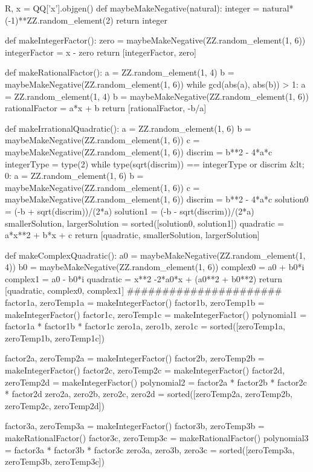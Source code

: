 \documentclass{ximera}
\begin{document}
\begin{sagesilent}
R, x = QQ['x'].objgen()
def maybeMakeNegative(natural):
    integer = natural*(-1)**ZZ.random_element(2)
    return integer
 
def makeIntegerFactor():
    zero = maybeMakeNegative(ZZ.random_element(1, 6))
    integerFactor = x - zero
    return [integerFactor, zero]
 
def makeRationalFactor():
    a = ZZ.random_element(1, 4)
    b = maybeMakeNegative(ZZ.random_element(1, 6))
    while gcd(abs(a), abs(b)) > 1:
        a = ZZ.random_element(1, 4)
        b = maybeMakeNegative(ZZ.random_element(1, 6))
    rationalFactor = a*x + b
    return [rationalFactor, -b/a]
 
def makeIrrationalQuadratic():
    a = ZZ.random_element(1, 6)
    b = maybeMakeNegative(ZZ.random_element(1, 6))
    c = maybeMakeNegative(ZZ.random_element(1, 6))
    discrim = b**2 - 4*a*c
    integerType = type(2)
    while type(sqrt(discrim)) == integerType or discrim &lt; 0:
        a = ZZ.random_element(1, 6)
        b = maybeMakeNegative(ZZ.random_element(1, 6))
        c = maybeMakeNegative(ZZ.random_element(1, 6))
        discrim = b**2 - 4*a*c
    solution0 = (-b + sqrt(discrim))/(2*a)
    solution1 = (-b - sqrt(discrim))/(2*a)
    smallerSolution, largerSolution = sorted([solution0, solution1])
    quadratic = a*x**2 + b*x + c
    return [quadratic, smallerSolution, largerSolution]
 
def makeComplexQuadratic():
    a0 = maybeMakeNegative(ZZ.random_element(1, 4))
    b0 = maybeMakeNegative(ZZ.random_element(1, 6))
    complex0 = a0 + b0*i
    complex1 = a0 - b0*i
    quadratic = x**2 -2*a0*x + (a0**2 + b0**2)
    return [quadratic, complex0, complex1]
######################
factor1a, zeroTemp1a = makeIntegerFactor()
factor1b, zeroTemp1b = makeIntegerFactor()
factor1c, zeroTemp1c = makeIntegerFactor()
polynomial1 = factor1a * factor1b * factor1c
zero1a, zero1b, zero1c = sorted([zeroTemp1a, zeroTemp1b, zeroTemp1c])
 
factor2a, zeroTemp2a = makeIntegerFactor()
factor2b, zeroTemp2b = makeIntegerFactor()
factor2c, zeroTemp2c = makeIntegerFactor()
factor2d, zeroTemp2d = makeIntegerFactor()
polynomial2 = factor2a * factor2b * factor2c * factor2d
zero2a, zero2b, zero2c, zero2d = sorted([zeroTemp2a, zeroTemp2b, zeroTemp2c, zeroTemp2d])
 
factor3a, zeroTemp3a = makeIntegerFactor()
factor3b, zeroTemp3b = makeRationalFactor()
factor3c, zeroTemp3c = makeRationalFactor()
polynomial3 = factor3a * factor3b * factor3c
zero3a, zero3b, zero3c = sorted([zeroTemp3a, zeroTemp3b, zeroTemp3c])
 

\end{sagesilent}
\end{document}
